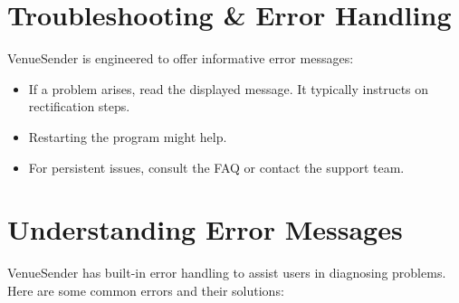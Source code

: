\documentclass{article}
\begin{document}
	\section*{Troubleshooting \& Error Handling}
	VenueSender is engineered to offer informative error messages:
	\begin{itemize}
		\item If a problem arises, read the displayed message. It typically instructs on rectification steps.
		\item Restarting the program might help.
		\item For persistent issues, consult the FAQ or contact the support team.
	\end{itemize}
	
	\section*{Understanding Error Messages}
	VenueSender has built-in error handling to assist users in diagnosing problems. Here are some common errors and their solutions:
\end{document}

